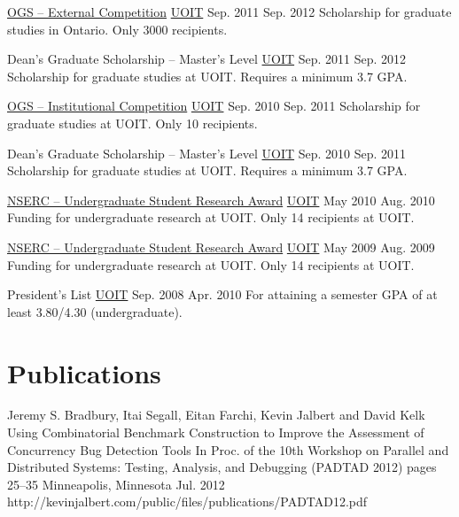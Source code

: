   \academicAwardsEntry
    {\href{https://osap.gov.on.ca/OSAPPortal/en/A-ZListofAid/TCONT003465.html}{OGS -- External Competition}}
    {\href{http://uoit.ca/}{UOIT}}
    {Sep. 2011}
    {Sep. 2012}
    {Scholarship for graduate studies in Ontario. Only 3000 recipients.}

  \academicAwardsEntry
    {Dean's Graduate Scholarship -- Master’s Level}
    {\href{http://uoit.ca/}{UOIT}}
    {Sep. 2011}
    {Sep. 2012}
    {Scholarship for graduate studies at UOIT. Requires a minimum 3.7 GPA.}

  \academicAwardsEntry
    {\href{http://gradstudies.uoit.ca/test/EN/main/future\_students/awards\_and\_funding/external\_awards/OGSInstitutional.html}{OGS -- Institutional Competition}}
    {\href{http://uoit.ca/}{UOIT}}
    {Sep. 2010}
    {Sep. 2011}
    {Scholarship for graduate studies at UOIT. Only 10 recipients.}

  \academicAwardsEntry
    {Dean's Graduate Scholarship -- Master’s Level}
    {\href{http://uoit.ca/}{UOIT}}
    {Sep. 2010}
    {Sep. 2011}
    {Scholarship for graduate studies at UOIT. Requires a minimum 3.7 GPA.}

  \academicAwardsEntry
    {\href{http://www.nserc-crsng.gc.ca/students-etudiants/ug-pc/usra-brpc_eng.asp}{NSERC -- Undergraduate Student Research Award}}
    {\href{http://uoit.ca/}{UOIT}}
    {May 2010}
    {Aug. 2010}
    {Funding for undergraduate research at UOIT. Only 14 recipients at UOIT.}

  \academicAwardsEntry
    {\href{http://www.nserc-crsng.gc.ca/students-etudiants/ug-pc/usra-brpc_eng.asp}{NSERC -- Undergraduate Student Research Award}}
    {\href{http://uoit.ca/}{UOIT}}
    {May 2009}
    {Aug. 2009}
    {Funding for undergraduate research at UOIT. Only 14 recipients at UOIT.}

  \academicAwardsEntry
    {President's List}
    {\href{http://uoit.ca/}{UOIT}}
    {Sep. 2008}
    {Apr. 2010}
    {For attaining a semester GPA of at least 3.80/4.30 (undergraduate).}

  \section{Publications}

  \publicationEntry
    {Jeremy S. Bradbury, Itai Segall, Eitan Farchi, Kevin Jalbert and David Kelk}
    {Using Combinatorial Benchmark Construction to Improve the Assessment of Concurrency Bug Detection Tools}
    {In Proc. of the 10th Workshop on Parallel and Distributed Systems: Testing, Analysis, and Debugging (PADTAD 2012)}
    {pages 25--35}
    {Minneapolis, Minnesota}
    {Jul. 2012}
    {http://kevinjalbert.com/public/files/publications/PADTAD12.pdf}

